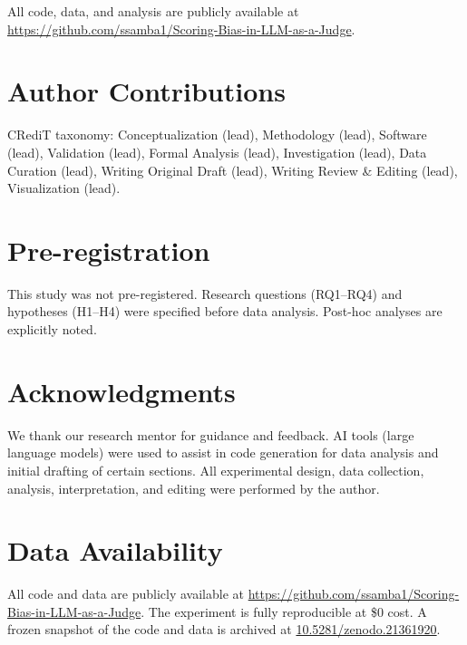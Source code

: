 \documentclass[11pt,twocolumn]{article}
\begin{document}
All code, data, and analysis are publicly available at \url{https://github.com/ssamba1/Scoring-Bias-in-LLM-as-a-Judge}.

\section*{Author Contributions}
CRediT taxonomy: Conceptualization (lead), Methodology (lead), Software (lead), Validation (lead), Formal Analysis (lead), Investigation (lead), Data Curation (lead), Writing  Original Draft (lead), Writing  Review \& Editing (lead), Visualization (lead).

\section*{Pre-registration}
This study was not pre-registered. Research questions (RQ1--RQ4) and hypotheses (H1--H4) were specified before data analysis. Post-hoc analyses are explicitly noted.

\section*{Acknowledgments}
We thank our research mentor for guidance and feedback. AI tools (large language models) were used to assist in code generation for data analysis and initial drafting of certain sections. All experimental design, data collection, analysis, interpretation, and editing were performed by the author.

\section*{Data Availability}
All code and data are publicly available at \url{https://github.com/ssamba1/Scoring-Bias-in-LLM-as-a-Judge}. The experiment is fully reproducible at \$0 cost. A frozen snapshot of the code and data is archived at \href{https://doi.org/10.5281/zenodo.21361920}{10.5281/zenodo.21361920}.



\end{document}
